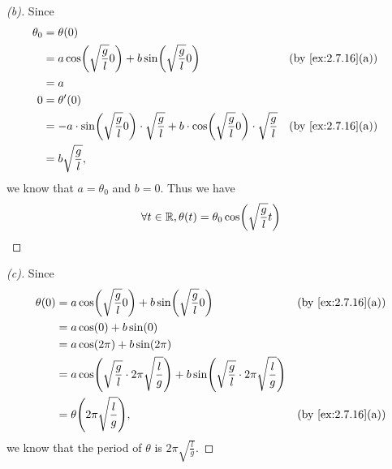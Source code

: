 \begin{proof}[(b)]
	Since
	\begin{align*}
		\theta_0 & = \theta(0)                                                                                                                                               \\
		         & = a \cos\pa{\sqrt{\frac{g}{l}} 0} + b \sin\pa{\sqrt{\frac{g}{l}} 0}                                                                &  & \by{ex:2.7.16}[a] \\
		         & = a                                                                                                                                                       \\
		0        & = \theta'(0)                                                                                                                                              \\
		         & = -a \cdot \sin\pa{\sqrt{\frac{g}{l}} 0} \cdot \sqrt{\frac{g}{l}} + b \cdot \cos\pa{\sqrt{\frac{g}{l}} 0} \cdot \sqrt{\frac{g}{l}} &  & \by{ex:2.7.16}[a] \\
		         & = b \sqrt{\frac{g}{l}},
	\end{align*}
	we know that \(a = \theta_0\) and \(b = 0\).
	Thus we have
	\[
		\forall t \in \R, \theta(t) = \theta_0 \cos\pa{\sqrt{\frac{g}{l}} t}
	\]
\end{proof}

\begin{proof}[(c)]
	Since
	\begin{align*}
		\theta(0) & = a \cos\pa{\sqrt{\frac{g}{l}} 0} + b \sin\pa{\sqrt{\frac{g}{l}} 0}                                                            &  & \by{ex:2.7.16}[a] \\
		          & = a \cos(0) + b \sin(0)                                                                                                                               \\
		          & = a \cos(2 \pi) + b \sin(2 \pi)                                                                                                                       \\
		          & = a \cos\pa{\sqrt{\frac{g}{l}} \cdot 2 \pi \sqrt{\frac{l}{g}}} + b \sin\pa{\sqrt{\frac{g}{l}}  \cdot 2 \pi \sqrt{\frac{l}{g}}}                        \\
		          & = \theta\pa{2 \pi \sqrt{\frac{l}{g}}},                                                                                         &  & \by{ex:2.7.16}[a]
	\end{align*}
	we know that the period of \(\theta\) is \(2 \pi \sqrt{\frac{l}{g}}\).
\end{proof}


